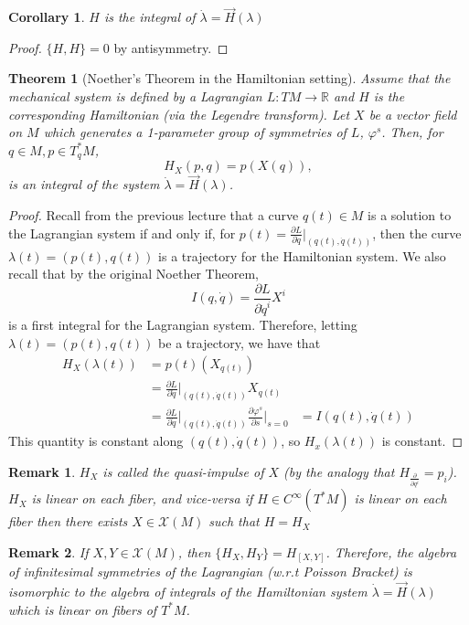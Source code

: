 \documentclass{article}
\newcommand{\R}{\mathbb R}
\newcommand{\vhi}{\varphi}
\newcommand{\pd}[1]{\frac{\partial}{\partial #1}}
\newcommand{\pdof}[2]{\frac{\partial #1}{\partial #2}}
\newtheorem{thm}{Theorem}
\newtheorem{cor}{Corollary}
\newtheorem{rk}{Remark}
\begin{document}
\begin{cor}
    $H$ is the integral of $\dot \lambda = \vec H(\lambda)$
\end{cor}
\begin{proof}
    $\{H,H\} = 0$ by antisymmetry.
\end{proof}
\begin{thm}[Noether's Theorem in the Hamiltonian setting]
    Assume that the mechanical system is defined by a Lagrangian $L:TM\to \R$ and $H$ is the corresponding Hamiltonian (via the Legendre transform). Let $X$ be a vector field on $M$ which generates a 1-parameter group of symmetries of $L$, $\vhi^s$. Then, for $q\in M, p\in T_q^*M$,
    \[H_X(p,q) = p(X(q)),\]
    is an integral of the system $\dot \lambda = \vec H(\lambda)$.
\end{thm}
\begin{proof}
    Recall from the previous lecture that a curve $q(t)\in M$ is a solution to the Lagrangian system if and only if, for $p(t) = \pdof{L}{\dot q}\big|_{(q(t),\dot q(t))}$, then the curve $\lambda(t) = (p(t),q(t))$ is a trajectory for the Hamiltonian system. We also recall that by the original Noether Theorem,
    \[I(q,\dot q) = \pdof{L}{\dot q^i}X^i\]
    is a first integral for the Lagrangian system. Therefore, letting $\lambda(t) = (p(t),q(t))$ be a trajectory, we have that 
    \begin{align*}
        H_X(\lambda(t)) &= p(t)\left(X_{q(t)}\right)\\
        &=\pdof{L}{\dot q}\Big|_{(q(t),\dot q(t))}X_{q(t)}\\
        &=\pdof{L}{\dot q}\Big|_{(q(t),\dot q(t))}\pdof{\vhi^s}{s}\Big|_{s=0}
        &=I(q(t),\dot q(t))
    \end{align*}
    This quantity is constant along $(q(t),\dot q(t))$, so $H_x(\lambda(t))$ is constant.
\end{proof}
\begin{rk}
    $H_X$ is called the quasi-impulse of $X$ (by the analogy that $H_{\pd{q^i}} = p_i$). $H_X$ is linear on each fiber, and vice-versa if $H\in C^\infty(T^*M)$ is linear on each fiber then there exists $X\in \mathcal{X}(M)$ such that $H=H_X$
\end{rk}
\begin{rk}
    If $X,Y\in \mathcal{X}(M)$, then $\{H_X,H_Y\} = H_{[X,Y]}$. Therefore, the algebra of infinitesimal symmetries of the Lagrangian (w.r.t Poisson Bracket) is isomorphic to the algebra of integrals of the Hamiltonian system $\dot \lambda = \vec H(\lambda)$ which is linear on fibers of $T^*M$.
\end{rk}
\end{document}
